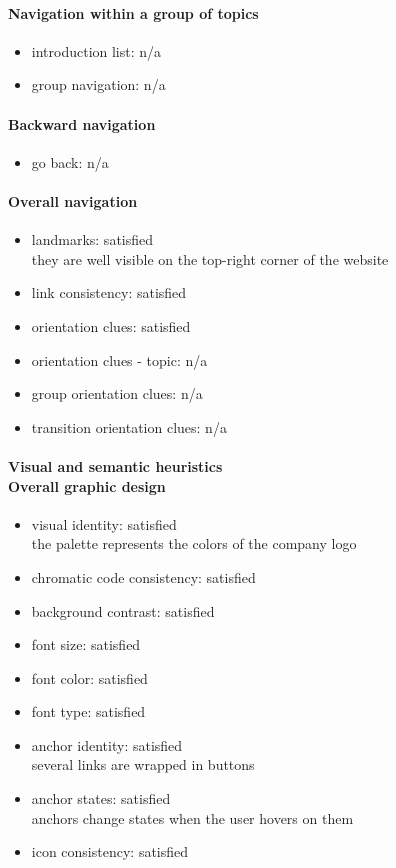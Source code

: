 \begin{enumerate}
	\paragraph*{Navigation within a group of topics}
	\begin{itemize}
		\item introduction list: n/a
		\item group navigation: n/a
	\end{itemize}
	
	\paragraph*{Backward navigation}
	\begin{itemize}
		\item go back: n/a
	\end{itemize}
	
	\paragraph*{Overall navigation}
	\begin{itemize}
		\item landmarks: satisfied\\
		they are well visible on the top-right corner of the website
		\item link consistency: satisfied
		\item orientation clues: satisfied
		\item orientation clues - topic: n/a
		\item group orientation clues: n/a
		\item transition orientation clues: n/a
	\end{itemize}	
	
	\paragraph*{Visual and semantic heuristics \\ Overall graphic design }
	\begin{itemize}
		\item visual identity: satisfied\\
		the palette represents the colors of the company logo
		\item chromatic code consistency: satisfied
		\item background contrast: satisfied
		\item font size: satisfied
		\item font color: satisfied
		\item font type: satisfied
		\item anchor identity: satisfied\\
		several links are wrapped in buttons 
		\item anchor states: satisfied\\
		anchors change states when the user hovers on them
		\item icon consistency: satisfied
	\end{itemize}
	

\end{enumerate}
